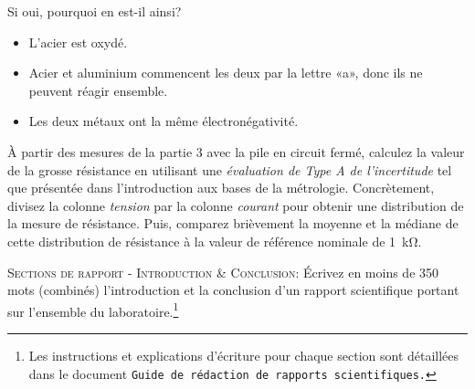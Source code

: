\documentclass[canadien,12pt,oneside,letterpaper]{article}
\begin{document}
\begin{gradescope}
\begin{gradescope}
    \item Si oui, pourquoi en est-il ainsi?
        \begin{itemize}[label=$\blacktriangleright$]
        \item L'acier est oxydé.
        \item Acier et aluminium commencent les deux par la lettre «a», donc ils ne peuvent réagir ensemble.
        \item Les deux métaux ont la même électronégativité.
        \end{itemize}
    \end{gradescope}
\item À partir des mesures de la partie 3 avec la pile en circuit fermé, calculez la valeur de la grosse résistance en utilisant une \textit{évaluation de Type A de l'incertitude} tel que présentée dans l’introduction aux bases de la métrologie. Concrètement, divisez la colonne \textit{tension} par la colonne \textit{courant} pour obtenir une distribution de la mesure de résistance. Puis, comparez brièvement la moyenne et la médiane de cette distribution de résistance à la valeur de référence nominale de \qty{1}{\kilo\ohm}.
\item \textsc{Sections de rapport - Introduction \& Conclusion:} Écrivez en moins de 350 mots (combinés) l'introduction et la conclusion d'un rapport scientifique portant sur l'ensemble du laboratoire.\footnote{Les instructions et explications d'écriture pour chaque section sont détaillées dans le document \texttt{Guide de rédaction de rapports scientifiques.}}
\end{gradescope}
\end{document}
